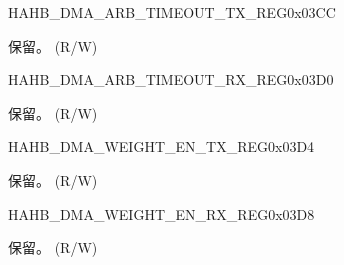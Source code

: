 \begin{register}{H}{AHB\_DMA\_ARB\_TIMEOUT\_TX\_REG}{0x03CC}\label{regdesc:AHBDMAARBTIMEOUTTXREG}
%
%
\regnewline%
\begin{regdesc}\begin{reglist}
\label{fielddesc:AHBDMAARBTIMEOUTTX}\item [AHB\_DMA\_ARB\_TIMEOUT\_TX] 保留。 (R/W)
\end{reglist}\end{regdesc}
\end{register}


\begin{register}{H}{AHB\_DMA\_ARB\_TIMEOUT\_RX\_REG}{0x03D0}\label{regdesc:AHBDMAARBTIMEOUTRXREG}
%
%
\regnewline%
\begin{regdesc}\begin{reglist}
\label{fielddesc:AHBDMAARBTIMEOUTRX}\item [AHB\_DMA\_ARB\_TIMEOUT\_RX] 保留。 (R/W)
\end{reglist}\end{regdesc}
\end{register}


\begin{register}{H}{AHB\_DMA\_WEIGHT\_EN\_TX\_REG}{0x03D4}\label{regdesc:AHBDMAWEIGHTENTXREG}
%
%
\regnewline%
\begin{regdesc}\begin{reglist}
\label{fielddesc:AHBDMAWEIGHTENTX}\item [AHB\_DMA\_WEIGHT\_EN\_TX] 保留。 (R/W)
\end{reglist}\end{regdesc}
\end{register}


\begin{register}{H}{AHB\_DMA\_WEIGHT\_EN\_RX\_REG}{0x03D8}\label{regdesc:AHBDMAWEIGHTENRXREG}
%
%
\regnewline%
\begin{regdesc}\begin{reglist}
\label{fielddesc:AHBDMAWEIGHTENRX}\item [AHB\_DMA\_WEIGHT\_EN\_RX] 保留。 (R/W)
\end{reglist}\end{regdesc}
\end{register}


